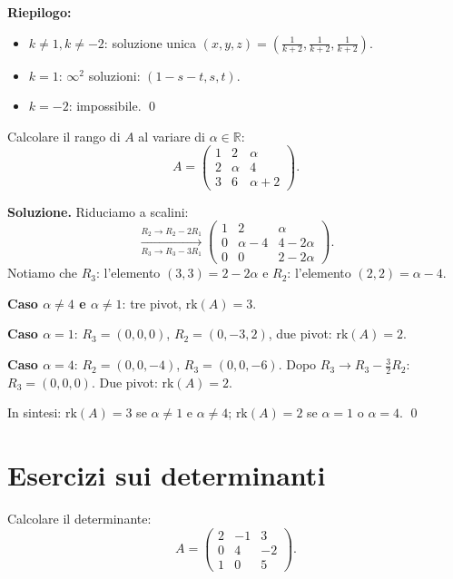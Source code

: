 \textbf{Riepilogo:}
\begin{itemize}
    \item $k \neq 1, k \neq -2$: soluzione unica $(x,y,z) = \left(\frac{1}{k+2}, \frac{1}{k+2}, \frac{1}{k+2}\right)$.
    \item $k = 1$: $\infty^2$ soluzioni: $(1-s-t, s, t)$.
    \item $k = -2$: impossibile. \qed
\end{itemize}

\medskip

\begin{examplebox}
Calcolare il rango di $A$ al variare di $\alpha \in \mathbb{R}$:
\[ A = \begin{pmatrix} 1 & 2 & \alpha \\ 2 & \alpha & 4 \\ 3 & 6 & \alpha+2 \end{pmatrix}. \]
\end{examplebox}

\textbf{Soluzione.} Riduciamo a scalini:
\[ \xrightarrow[R_3 \to R_3 - 3R_1]{R_2 \to R_2 - 2R_1} \begin{pmatrix} 1 & 2 & \alpha \\ 0 & \alpha - 4 & 4 - 2\alpha \\ 0 & 0 & 2 - 2\alpha \end{pmatrix}. \]
Notiamo che $R_3$: l'elemento $(3,3) = 2 - 2\alpha$ e $R_2$: l'elemento $(2,2) = \alpha - 4$.

\textbf{Caso $\alpha \neq 4$ e $\alpha \neq 1$}: tre pivot, $\text{rk}(A) = 3$.

\textbf{Caso $\alpha = 1$}: $R_3 = (0, 0, 0)$, $R_2 = (0, -3, 2)$, due pivot: $\text{rk}(A) = 2$.

\textbf{Caso $\alpha = 4$}: $R_2 = (0, 0, -4)$, $R_3 = (0, 0, -6)$. Dopo $R_3 \to R_3 - \frac{3}{2}R_2$: $R_3 = (0,0,0)$. Due pivot: $\text{rk}(A) = 2$.

In sintesi: $\text{rk}(A) = 3$ se $\alpha \neq 1$ e $\alpha \neq 4$; $\text{rk}(A) = 2$ se $\alpha = 1$ o $\alpha = 4$. \qed

\section{Esercizi sui determinanti}
\label{sec:es-determinanti}

\begin{examplebox}
Calcolare il determinante:
\[ A = \begin{pmatrix} 2 & -1 & 3 \\ 0 & 4 & -2 \\ 1 & 0 & 5 \end{pmatrix}. \]
\end{examplebox}

